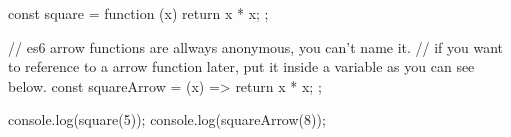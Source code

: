const square = function (x) {
    return x * x;
};

// es6 arrow functions are allways anonymous, you can't name it.
// if you want to reference to a arrow function later, put it inside a variable as you can see below.
const squareArrow = (x) => {
    return x * x;
};

console.log(square(5));
console.log(squareArrow(8));